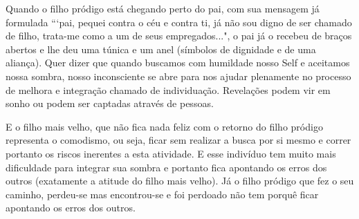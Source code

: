 \emdash{}Quando o filho pródigo está chegando perto do pai, com sua mensagem já formulada ```pai, pequei contra o céu e contra ti, já não sou digno de ser chamado de filho, trata-me como a um de seus empregados...", o pai já o recebeu de braços abertos e lhe deu uma túnica e um anel (símbolos de dignidade e de uma aliança). Quer dizer que quando buscamos com humildade nosso Self e aceitamos nossa sombra, nosso inconsciente se abre para nos ajudar plenamente no processo de melhora e integração chamado de individuação. Revelações podem vir em sonho ou podem ser captadas através de pessoas.

\emdash{}E o filho mais velho, que não fica nada feliz com o retorno do filho pródigo representa o comodismo, ou seja, ficar sem realizar a busca por si mesmo e correr portanto os riscos inerentes a esta atividade. E esse indivíduo tem muito mais dificuldade para integrar sua sombra e portanto fica apontando os erros dos outros (exatamente a atitude do filho mais velho). Já o filho pródigo que fez o seu caminho, perdeu-se mas encontrou-se e foi perdoado não tem porquê ficar apontando os erros dos outros.